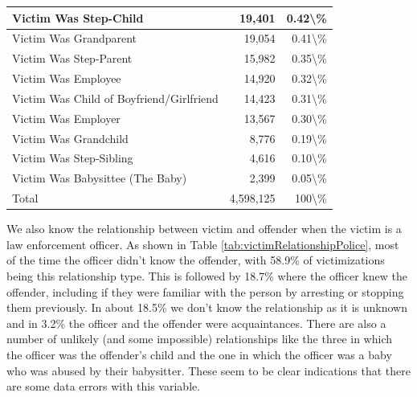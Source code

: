 \documentclass[
]{krantz}
\begin{document}
\begin{longtable}[t]{l|r|r}
\hline
Victim Was Step-Child & 19,401 & 0.42\textbackslash{}\%\\
\hline
Victim Was Grandparent & 19,054 & 0.41\textbackslash{}\%\\
\hline
Victim Was Step-Parent & 15,982 & 0.35\textbackslash{}\%\\
\hline
Victim Was Employee & 14,920 & 0.32\textbackslash{}\%\\
\hline
Victim Was Child of Boyfriend/Girlfriend & 14,423 & 0.31\textbackslash{}\%\\
\hline
Victim Was Employer & 13,567 & 0.30\textbackslash{}\%\\
\hline
Victim Was Grandchild & 8,776 & 0.19\textbackslash{}\%\\
\hline
Victim Was Step-Sibling & 4,616 & 0.10\textbackslash{}\%\\
\hline
Victim Was Babysittee (The Baby) & 2,399 & 0.05\textbackslash{}\%\\
\hline
Total & 4,598,125 & 100\textbackslash{}\%\\
\hline
\end{longtable}

We also know the relationship between victim and offender
when the victim is a law enforcement officer. As shown in
Table \ref{tab:victimRelationshipPolice}, most of the time
the officer didn't know the offender, with 58.9\% of
victimizations being this relationship type. This is
followed by 18.7\% where the officer knew the offender,
including if they were familiar with the person by arresting
or stopping them previously. In about 18.5\% we don't know
the relationship as it is unknown and in 3.2\% the officer
and the offender were acquaintances. There are also a number
of unlikely (and some impossible) relationships like the
three in which the officer was the offender's child and the
one in which the officer was a baby who was abused by their
babysitter. These seem to be clear indications that there
are some data errors with this variable.
\end{document}

